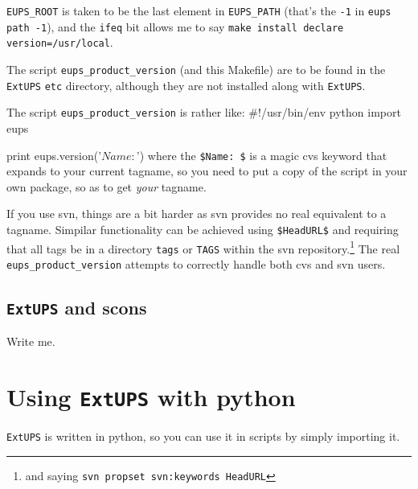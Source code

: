 \documentclass{article}
\newcommand{\code}[1]{\texttt{#1}}
\newcommand{\eups}{\code{ExtUPS}}
\let\overbatim=\verbatim
\let\oendverbatim=\endverbatim
\renewenvironment{verbatim}
{\center\minipage{16cm}\overbatim}
{\oendverbatim\endminipage\endcenter}
\begin{document}
\code{EUPS\_ROOT} is taken to be the last element in \code{EUPS\_PATH} (that's
the \code{-1} in \code{eups path -1}),
and the \code{ifeq} bit allows me to say \code{make install declare version=/usr/local}.

The script \code{eups\_product\_version} (and this Makefile) are to be found
in the \eups{} \code{etc} directory, although they are not installed along
with \eups{}.

The script \code{eups\_product\_version} is rather like:
\begin{verbatim}
#!/usr/bin/env python
import eups

print eups.version('$Name: $')
\end{verbatim}
where the \code{\$Name:  \$} is a magic cvs keyword that expands to your
current tagname, so you need to put a copy of the script in your own
package, so as to get \emph{your} tagname.

If you use svn, things are a bit harder as svn provides no real
equivalent to a tagname. Simpilar functionality can be achieved using \code{\$HeadURL\$}
and requiring that all tags be in a directory \code{tags}
or \code{TAGS} within the svn repository.\footnote{
  and saying \code{svn propset svn:keywords HeadURL}}
The real \code{eups\_product\_version} attempts to correctly handle both cvs
and svn users.

\subsection{\eups{} and scons}
\label{scons}

Write me.

\appendix

\section{Using \eups{} with python}

\eups{} is written in python, so you can use it in scripts by simply importing it.
\end{document}
